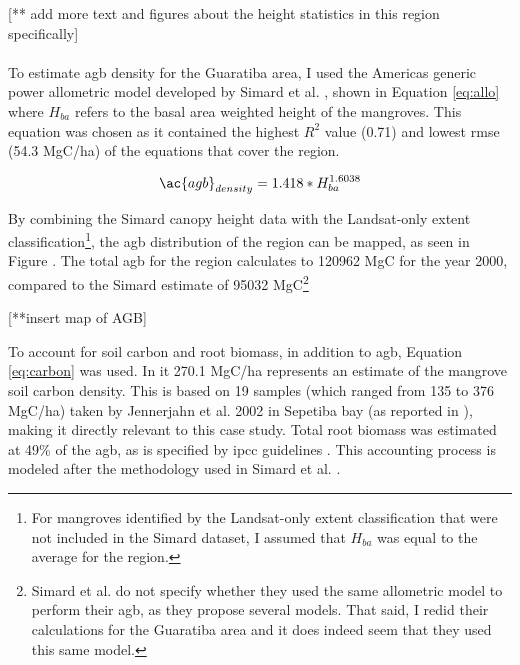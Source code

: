 [** add more text and figures about the height statistics in this region specifically]

\paragraph{} \label{sec:rio-mangrove-height} \leavevmode\newline

To estimate \ac{agb} density for the Guaratiba area, I used the Americas generic power allometric model developed by Simard et al. \cite{simardMangroveCanopyHeight2019}, shown in Equation \ref{eq:allo} where $H_{ba}$ refers to the basal area weighted height of the mangroves. This equation was chosen as it contained the highest $R^2$ value (0.71) and lowest \ac{rmse} (54.3 MgC/ha) of the equations that cover the region. 

\begin{equation}
\label{eq:allo}
\ac{agb}_{density} = 1.418 * H_{ba}^{1.6038}
\end{equation}

By combining the Simard canopy height data with the Landsat-only extent classification\footnote{For mangroves identified by the Landsat-only extent classification that were not included in the Simard dataset, I assumed that $H_{ba}$ was equal to the average for the region.}, the \ac{agb} distribution of the region can be mapped, as seen in Figure . The total \ac{agb} for the region calculates to 120962 MgC for the year 2000, compared to the Simard estimate of 95032 MgC\footnote{Simard et al. do not specify whether they used the same allometric model to perform their \ac{agb}, as they propose several models. That said, I redid their calculations for the Guaratiba area and it does indeed seem that they used this same model.}

[**insert map of AGB]


To account for soil carbon and root biomass, in addition to \ac{agb}, Equation \ref{eq:carbon} was used. In it 270.1 MgC/ha represents an estimate of the mangrove soil carbon density. This is based on 19 samples (which ranged from 135 to 376 MgC/ha) taken by Jennerjahn et al. 2002 \cite{jennerjahnRelevanceMangrovesProduction2002} in Sepetiba bay (as reported in \cite{kristensenOrganicCarbonDynamics2008, atwoodGlobalPatternsMangrove2017}), making it directly relevant to this case study.  Total root biomass was estimated at 49\% of the \ac{agb}, as is specified by \ac{ipcc} guidelines \cite{takahiko2013Supplement20062014}. This accounting process is modeled after the methodology used in Simard et al. \cite{simardMangroveCanopyHeight2019}.


